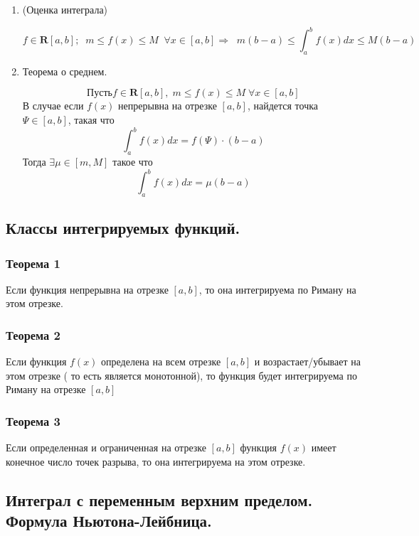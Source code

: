 \documentclass[a4paper,12pt]{article}
\theoremstyle{plain} %
\theoremstyle{definition} %
\theoremstyle{remark} %
\begin{document}
\begin{enumerate}
	\item (Оценка интеграла)

	      \[
		      f \in \mathbf{R}[a, b]; \; \; m \leq f(x) \leq M \; \; \forall x \in [a, b] \Rightarrow \; \; m(b - a) \leq \int_a^b f(x) dx \leq M(b-a)
	      \]

	\item Теорема о среднем.

	      \[
		      Пусть f \in \mathbf{R} [a, b], \; m \leq f(x) \leq M \; \forall x \in [a, b]
	      \]
	      В случае если $f(x)$ непрерывна на отрезке $[a, b]$, найдется точка $\Psi \in [a, b]$, такая что
	      \[ \int_a^b f(x) dx = f(\Psi)\cdot (b - a) \]
	      Тогда $\exists \mu \in [m, M]$ такое что
	      \[
		      \int_a^b f(x) dx = \mu (b - a)
	      \]
\end{enumerate}



\newpage
\subsection*{Классы интегрируемых функций.                                                                }

\subsubsection*{Теорема 1}
Если функция непрерывна на отрезке $[a, b]$, то она интегрируема по Риману на этом отрезке.

\subsubsection*{Теорема 2}
Если функция $f(x)$ определена на всем отрезке $[a, b]$ и возрастает/убывает на этом отрезке ( то есть является монотонной), то функция будет интегрируема по Риману на отрезке $[a, b]$

\subsubsection*{Теорема 3}
Если определенная и ограниченная на отрезке $[a, b]$ функция $f(x)$ имеет конечное число точек разрыва, то она интегрируема на этом отрезке.

\newpage
\subsection*{Интеграл с переменным верхним пределом. Формула Ньютона-Лейбница.                            }
\end{document}
